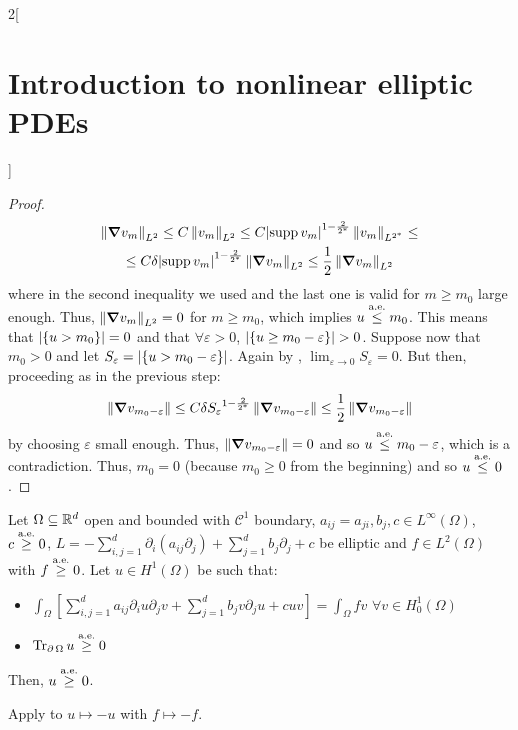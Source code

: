 \documentclass[../../../main_math.tex]{subfiles}
\begin{document}
\begin{multicols}{2}[\section{Introduction to nonlinear elliptic PDEs}]
\begin{proof}
    \begin{multline*}
      \left\|\grad v_m\right\|_{L^2}\leq C \left\|v_m\right\|_{L^2}\leq C{\abs{\operatorname{supp} v_m}}^{1-\frac{2}{2^*}}\left\|v_m\right\|_{L^{2^*}}\leq \\
      \leq C\delta {\abs{\operatorname{supp}v_m}}^{1-\frac{2}{2^*}}\left\|\grad v_m\right\|_{L^2}\leq \frac{1}{2} \left\|\grad v_m\right\|_{L^2}
    \end{multline*}
    where in the second inequality we used  and the last one is valid for $m\geq m_0$ large enough. Thus, $\left\|\grad v_m\right\|_{L^2}=0$ for $m\geq m_0$, which implies $u\overset{\text{a.e.}}{\leq}m_0$. This means that $\abs{\{u>m_0\}}=0$ and that $\forall \varepsilon >0$, $\abs{\{u\geq m_0-\varepsilon\}}>0$. Suppose now that $m_0>0$ and let $S_\varepsilon=\abs{\{u> m_0-\varepsilon\}}$. Again by , $\displaystyle\lim_{\varepsilon\to 0}S_\varepsilon=0$. But then, proceeding as in the previous step:
    $$
      \left\|\grad v_{m_0-\varepsilon}\right\|\leq C \delta {S_\varepsilon}^{1-\frac{2}{2^*}}\left\|\grad v_{m_0-\varepsilon}\right\|\leq \frac{1}{2}\left\|\grad v_{m_0-\varepsilon}\right\|
    $$
    by choosing $\varepsilon$ small enough. Thus, $\left\|\grad v_{m_0-\varepsilon}\right\|=0$ and so $u\overset{\text{a.e.}}{\leq}m_0-\varepsilon$, which is a contradiction. Thus, $m_0= 0$ (because $m_0\geq 0$ from the beginning) and so $u\overset{\text{a.e.}}{\leq}0$.
  \end{proof}
  \begin{theorem}\label{INEPDE:weak_min_principle}
    Let $\Omega\subseteq\mathbb{R}^d$ open and bounded with $\mathcal{C}^1$ boundary, $a_{ij}=a_{ji},b_j,c\in L^\infty(\Omega)$, $c \overset{\text{a.e.}}{\geq}0$, $L=-\sum_{i,j=1}^d\partial_i(a_{ij}\partial_j)+\sum_{j=1}^db_j\partial_j+c$ be elliptic and $f\in L^2(\Omega)$ with $f\overset{\text{a.e.}}{\geq} 0$. Let $u\in H^1(\Omega)$ be such that:
    \begin{itemize}
      \item $\displaystyle \int_\Omega\left[\sum_{i,j=1}^da_{ij}\partial_iu\partial_jv+ \sum_{j=1}^db_jv\partial_ju+cuv\right]=\int_\Omega fv$ $\forall v\in H^1_0(\Omega)$
      \item $\Tr_{\operatorname{\partial}{\Omega}}u\overset{\text{a.e.}}{\geq}0$
    \end{itemize}
    Then, $u\overset{\text{a.e.}}{\geq}0$.
  \end{theorem}
  \begin{sproof}
    Apply  to $u\mapsto -u$ with $f\mapsto -f$.
  \end{sproof}
  \begin{corollary}\label{INEPDE:corollary_max_min}

\end{corollary}
\end{multicols}
\end{document}
